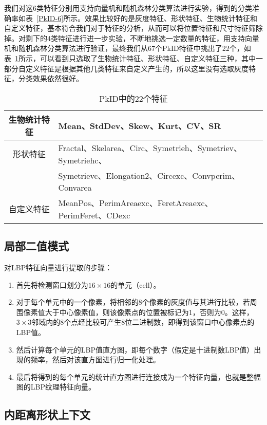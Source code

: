 我们对这6类特征分别用支持向量机和随机森林分类算法进行实验，得到的分类准确率如表~\ref{PkID-6}所示。效果比较好的是灰度特征、形状特征、生物统计特征和自定义特征，基本符合我们对于特征的分析，从而可以将位置特征和尺寸特征筛除掉。对剩下的4类特征进行进一步实验，不断地挑选一定数量的特征，用支持向量机和随机森林分类算法进行验证，最终我们从67个PkID特征中挑出了22个，如表~\ref{表2}所示，可以看到只选取了生物统计特征、形状特征、自定义特征三种，其中一部分自定义特征是根据其他几类特征来自定义产生的，所以这里没有选取灰度特征，分类效果依然很好。

\begin{table}[htbp]
\centering
\caption{PkID中的22个特征}
\begin{tabular}{|c|l|}
\hline
生物统计特征 & Mean、StdDev、Skew、Kurt、CV、SR \\
\hline
形状特征 & Fractal、Skelarea、Circ、Symetrieh、Symetriev、Symetriehc、\\
 & Symetrievc、Elongation2、Circexc、Convperim、Convarea\\ 
 \hline
自定义特征 & MeanPos、PerimAreaexc、FeretAreaexc、PerimFeret、CDexc \\
\hline
\end{tabular}
\label{表2}
\end{table}

\subsection{局部二值模式}

   
对LBP特征向量进行提取的步骤：
\begin{enumerate}
    \item 首先将检测窗口划分为$16\times16$的单元（cell）。
    \item 对于每个单元中的一个像素，将相邻的8个像素的灰度值与其进行比较，若周围像素值大于中心像素值，则该像素点的位置被标记为1，否则为0。这样，$3\times3$邻域内的8个点经比较可产生8位二进制数，即得到该窗口中心像素点的LBP值。
    \item 然后计算每个单元的LBP值直方图，即每个数字（假定是十进制数LBP值）出现的频率，然后对该直方图进行归一化处理。
    \item 最后将得到的每个单元的统计直方图进行连接成为一个特征向量，也就是整幅图的LBP纹理特征向量。
\end{enumerate}

\subsection{内距离形状上下文}

